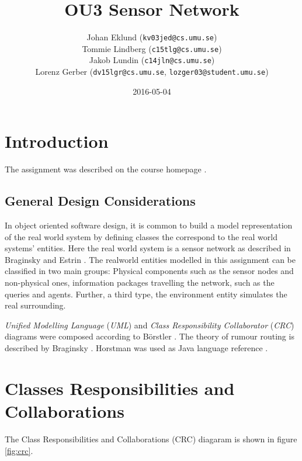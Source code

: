 \documentclass[a4paper,11pt,twoside]{article}
\title{OU3 Sensor Network}
\author{Johan Eklund ({\tt{kv03jed@cs.umu.se}}) \\ 
Tommie Lindberg ({\tt{c15tlg@cs.umu.se}}) \\
Jakob Lundin ({\tt{c14jln@cs.umu.se}}) \\
Lorenz Gerber ({\tt{dv15lgr@cs.umu.se}}, {\tt{lozger03@student.umu.se}})
}
\date{2016-05-04}
\begin{document}
\lstset{language=C}
\maketitle
\thispagestyle{empty}
\newpage
\tableofcontents
\thispagestyle{empty}
\newpage

\clearpage
{}

\section{Introduction} 
The assignment was described on the course homepage
\cite{sensornetwork}. 

\subsection{General Design Considerations}
In object oriented software design, it is common to build 
a model representation of the real world system \cite{roleplay} by
defining classes the correspond to the real world systems' entities.  
Here the real world system is a sensor network as described in
Braginsky and Estrin \cite{braginsky2002}. The realworld entities
modelled in this assignment can be classified in two main groups: Physical
components such as the sensor nodes and non-physical ones, information packages
travelling the network, such as the queries and agents. Further, a third type, 
the environment entity simulates the real surrounding.



\textit{Unified Modelling Language}
(\textit{UML}) and \textit{Class Responsibility Collaborator}
(\textit{CRC}) diagrams were composed according to Börstler
\cite{roleplay}. The theory of rumour routing is described by Braginsky
\cite{braginsky2002}. Horstman was used as Java language reference
\cite{horstman2014}.


\section{Classes Responsibilities and Collaborations}
The Class Responsibilities and Collaborations (CRC) diagaram is shown
in figure \ref{fig:crc}.
 
\end{document}
